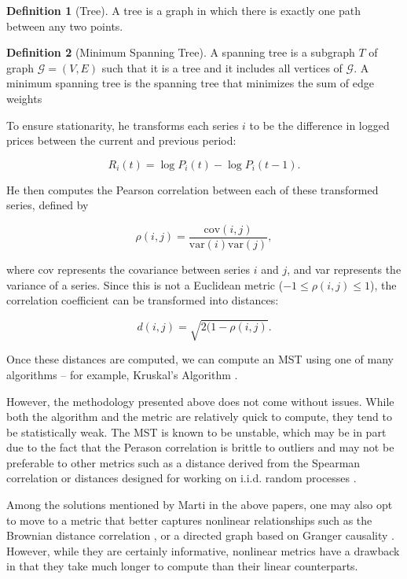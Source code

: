 \documentclass{article}
\theoremstyle{definition}
\newtheorem{definition}{Definition}[section]
\begin{document}
\begin{definition}[Tree]
A tree is a graph in which there is exactly one path between any two points.
\end{definition}

\begin{definition}[Minimum Spanning Tree]
A spanning tree is a subgraph $T$ of graph $\mathcal{G} = (V, E)$ such that it is a tree and it includes all vertices of $\mathcal{G}$. A minimum spanning tree is the spanning tree that minimizes the sum of edge weights 
\end{definition}

To ensure stationarity, he transforms each series $i$ to be the difference in logged prices between the current and previous period:

\[
R_i(t) = \log P_i(t) - \log P_i(t-1).
\]

He then computes the Pearson correlation between each of these transformed series, defined by

\[
\rho(i,j) = \frac{\text{cov}(i, j)}{\text{var}(i) \text{var}(j)},
\]

where cov represents the covariance between series $i$ and $j$, and var represents the variance of a series. Since this is not a Euclidean metric ($-1 \leq \rho(i,j) \leq 1$), the correlation coefficient can be transformed into distances:

\[
d(i,j) = \sqrt{2(1 - \rho(i,j)}.
\]

Once these distances are computed, we can compute an MST using one of many algorithms -- for example, Kruskal's Algorithm \cite{kruskalsAlgorithm}\cite{networkSurveyFinance}.

However, the methodology presented above does not come without issues. While both the algorithm and the metric are relatively quick to compute, they tend to be statistically weak. The MST is known to be unstable, which may be in part due to the fact that the Perason correlation is brittle to outliers and may not be preferable to other metrics such as a distance derived from the Spearman correlation or distances designed for working on i.i.d. random processes \cite{marti2015proposal}\cite{marti2015generic}.

Among the solutions mentioned by Marti in the above papers, one may also opt to move to a metric that better captures nonlinear relationships such as the Brownian distance correlation \cite{distanceCorrelation}, or a directed graph based on Granger causality \cite{grangerCausalityNetworks}. However, while they are certainly informative, nonlinear metrics have a drawback in that they take much longer to compute than their linear counterparts.
\end{document}

